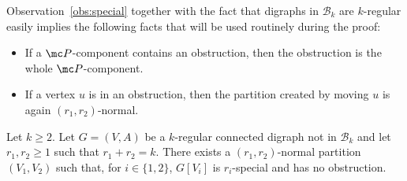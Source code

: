 Observation~\ref{obs:special} together with the fact that digraphs in $\mathcal B_k$ are $k$-regular easily implies the following facts that will be used routinely during the proof:
\begin{itemize}
    \item If a $\mc P$-component contains an obstruction, then the obstruction is the whole $\mc P$-component. 
    \item If a vertex $u$ is in an obstruction, then the partition created by moving $u$ is again $(r_1, r_2)$-normal.
\end{itemize}

\begin{lemma} \label{lem:partition}
Let $k \geq 2$. 
Let $G = (V, A)$ be a $k$-regular connected digraph not in $\mathcal B_{k}$ and let $r_{1}, r_{2} \geq 1$ such that $r_{1} + r_{2} = k$. There exists a $(r_1, r_2)$-normal partition $(V_{1},V_{2})$ such that, for $i \in \{1,2\}$, $G[V_{i}]$ is $r_i$-special and has no obstruction.
\end{lemma}



